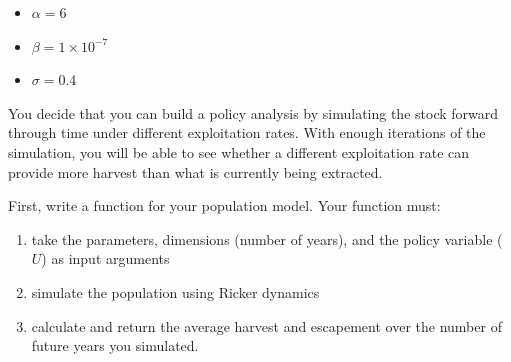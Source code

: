 \documentclass[]{book}
\providecommand{\tightlist}{%
  \setlength{\itemsep}{0pt}\setlength{\parskip}{0pt}}
\theoremstyle{definition}
\theoremstyle{definition}
\theoremstyle{definition}
\theoremstyle{remark}
\begin{document}
\begin{itemize}
\tightlist
\item
  \(\alpha = 6\)
\item
  \(\beta = 1 \times 10^{-7}\)
\item
  \(\sigma = 0.4\)
\end{itemize}

You decide that you can build a policy analysis by simulating the stock
forward through time under different exploitation rates. With enough
iterations of the simulation, you will be able to see whether a
different exploitation rate can provide more harvest than what is
currently being extracted.

First, write a function for your population model. Your function must:

\begin{enumerate}
\def\labelenumi{\arabic{enumi}.}
\tightlist
\item
  take the parameters, dimensions (number of years), and the policy
  variable (\(U\)) as input arguments
\item
  simulate the population using Ricker dynamics
\item
  calculate and return the average harvest and escapement over the
  number of future years you simulated.
\end{enumerate}
\end{document}

